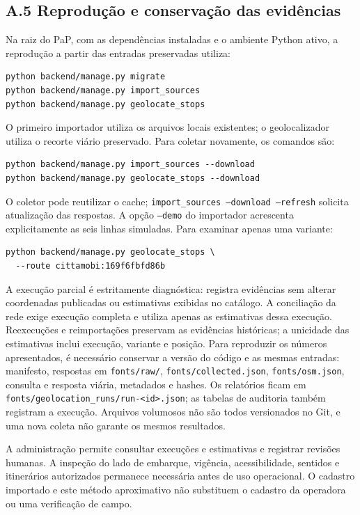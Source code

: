 \documentclass[12pt,oneside,a4paper,brazil]{abntex2}
\begin{document}
\begin{apendicesenv}
\section*{A.5 Reprodução e conservação das evidências}
Na raiz do PaP, com as dependências instaladas e o ambiente Python ativo, a reprodução a partir das entradas preservadas utiliza:
\begin{verbatim}
python backend/manage.py migrate
python backend/manage.py import_sources
python backend/manage.py geolocate_stops
\end{verbatim}
O primeiro importador utiliza os arquivos locais existentes; o geolocalizador utiliza o recorte viário preservado. Para coletar novamente, os comandos são:
\begin{verbatim}
python backend/manage.py import_sources --download
python backend/manage.py geolocate_stops --download
\end{verbatim}
O coletor pode reutilizar o cache; \texttt{import\_sources --download --refresh} solicita atualização das respostas. A opção \texttt{--demo} do importador acrescenta explicitamente as seis linhas simuladas. Para examinar apenas uma variante:
\begin{verbatim}
python backend/manage.py geolocate_stops \
  --route cittamobi:169f6fbfd86b
\end{verbatim}
A execução parcial é estritamente diagnóstica: registra evidências sem alterar coordenadas publicadas ou estimativas exibidas no catálogo. A conciliação da rede exige execução completa e utiliza apenas as estimativas dessa execução. Reexecuções e reimportações preservam as evidências históricas; a unicidade das estimativas inclui execução, variante e posição. Para reproduzir os números apresentados, é necessário conservar a versão do código e as mesmas entradas: manifesto, respostas em \texttt{fonts/raw/}, \texttt{fonts/collected.json}, \texttt{fonts/osm.json}, consulta e resposta viária, metadados e hashes. Os relatórios ficam em \nolinkurl{fonts/geolocation_runs/run-<id>.json}; as tabelas de auditoria também registram a execução. Arquivos volumosos não são todos versionados no Git, e uma nova coleta não garante os mesmos resultados.

A administração permite consultar execuções e estimativas e registrar revisões humanas. A inspeção do lado de embarque, vigência, acessibilidade, sentidos e itinerários autorizados permanece necessária antes de uso operacional. O cadastro importado e este método aproximativo não substituem o cadastro da operadora ou uma verificação de campo.
\end{apendicesenv}
\end{document}
